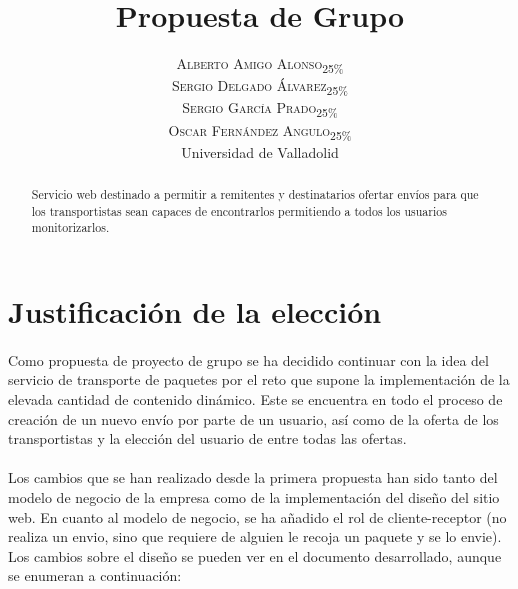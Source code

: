 \documentclass[10pt, a4paper,spanish]{article}
\title{\vspace{-15mm}\fontsize{24pt}{10pt}\selectfont\textbf{Propuesta de Grupo}} %
\author{
\large
\textsc{Alberto Amigo Alonso\textsubscript{25\%}}\\[2mm] %
\textsc{Sergio Delgado Álvarez\textsubscript{25\%}}\\[2mm] %
\textsc{Sergio García Prado\textsubscript{25\%}}\\[2mm] %
\textsc{Oscar Fernández Angulo\textsubscript{25\%}}\\[2mm] %
\normalsize Universidad de Valladolid \\ %
\vspace{-5mm}
}
\date{}
\begin{document}
	\maketitle %

	\thispagestyle{fancy} %


	\begin{abstract}
		\noindent Servicio web destinado a permitir a remitentes y destinatarios ofertar envíos para que los transportistas sean capaces de encontrarlos permitiendo a todos los usuarios monitorizarlos.
	\end{abstract}

		\section{Justificación de la elección}

			\paragraph{}
			Como propuesta de proyecto de grupo se ha decidido continuar con la idea del servicio de transporte de paquetes por el reto que supone la implementación de la elevada cantidad de contenido dinámico. Este se encuentra en todo el proceso de creación de un nuevo envío por parte de un usuario, así como de la oferta de los transportistas y la elección del usuario de entre todas las ofertas.

			\paragraph{}
			Los cambios que se han realizado desde la primera propuesta han sido tanto del modelo de negocio de la empresa como de la implementación del diseño del sitio web. En cuanto al modelo de negocio, se ha añadido el rol de cliente-receptor (no realiza un envio, sino que requiere de alguien le recoja un paquete y se lo envie). Los cambios sobre el diseño se pueden ver en el documento desarrollado, aunque se enumeran a continuación:
\end{document}
